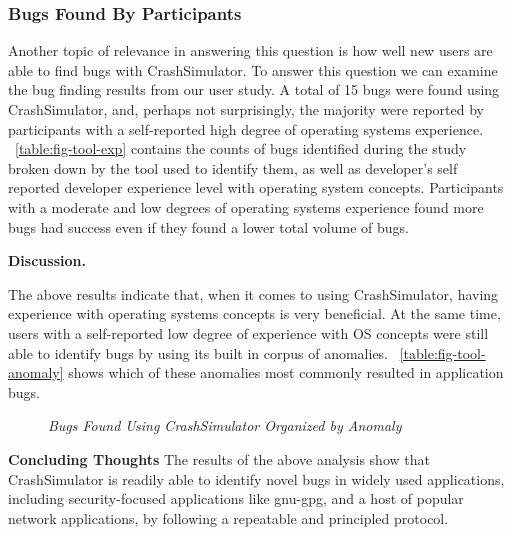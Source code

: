 \subsubsection{Bugs Found By Participants}

Another topic of relevance in answering this question is how well new users are
able to find bugs with CrashSimulator.
To answer this question we can examine the bug finding results from our user
study.
A total of 15 bugs were found using CrashSimulator, and, perhaps not
surprisingly, the majority were reported by participants with a
self-reported high degree of operating systems experience.
~\ref{table:fig-tool-exp} contains the
counts of bugs identified during the study broken down by
the tool used to identify them, as well as developer's self reported
developer experience level with operating system concepts.
Participants with a moderate and low degrees of operating
systems experience found more bugs had success even if they found a lower total
volume of bugs.

{\bf Discussion. }

The above results indicate that, when it comes to using CrashSimulator,
having experience with operating systems concepts is very beneficial.  At
the same time, users with a self-reported low degree of experience with OS
concepts were still able to identify bugs by using its built in corpus of
anomalies. ~\ref{table:fig-tool-anomaly} shows which
of these anomalies most commonly
resulted in application bugs.

\begin{figure}[t]
  \center{}
  \caption{\emph{Bugs Found Using CrashSimulator Organized by Anomaly}}
  \label{fig-tool-anomaly}
\end{figure}

{\bf Concluding Thoughts} The results of the above analysis show that
CrashSimulator is readily able to identify novel bugs in widely used
applications, including security-focused applications like gnu-gpg, and a host
of popular network applications, by following a repeatable and principled
protocol.


